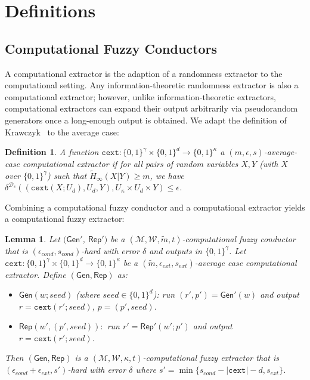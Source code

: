 \documentclass[11pt]{article}
\newcommand{\class}[1]{{\ensuremath{\mathsf{#1}}}}
\newcommand{\gen}{\ensuremath{\class{Gen}}\xspace}
\newcommand{\rep}{\ensuremath{\class{Rep}}\xspace}
\newcommand{\zo}{\ensuremath{\{0, 1\}}}
\newcommand{\cext}{\ensuremath{\mathtt{cext}}}
\newtheorem{lemma}[theorem]{Lemma}
\newtheorem{definition}[theorem]{Definition}
\begin{document}
\appendix

\section{Definitions}
\subsection{Computational Fuzzy Conductors}
\label{sec:further defs}
A computational extractor is the adaption of a randomness extractor to the computational setting.  Any information-theoretic randomness extractor is also a computational extractor; however, unlike information-theoretic extractors, computational extractors can expand their output arbitrarily via pseudorandom generators once a long-enough output is obtained. We adapt the definition of Krawczyk~\cite{krawczyk2010cryptographic} to the average case:
\begin{definition}
A function $\cext: \zo^\gamma \times \{0,1\}^d \rightarrow \{0,1\}^\kappa$ a \emph{$(m, \epsilon, s)$-average-case computational extractor} if for all pairs
of random variables $X, Y$ (with $X$ over $\zo^\gamma$) such that
$\tilde{H}_\infty(X|Y) \ge m$, we have $\delta^{\mathcal{D}_{s}}((\cext(X; U_d), U_d, Y), U_\kappa\times
U_d \times Y) \le \epsilon$.
\end{definition}

Combining a computational fuzzy conductor and a computational extractor yields a computational fuzzy extractor:

\begin{lemma}
\label{lem:cond and cext}
Let $(\gen'$, $\rep')$ be a $(\mathcal{M}, \mathcal{W}, \tilde{m}, t)$-computational fuzzy conductor that is $(\epsilon_{cond}, s_{cond})$-hard with error $\delta$ and outputs in $\zo^\gamma$.  Let $\cext:\zo^\gamma\times \zo^d\rightarrow \zo^\kappa$ be a $(\tilde{m}, \epsilon_{ext}, s_{ext})$-average case computational extractor.  Define $(\gen, \rep)$ as:
\begin{itemize}
\item $\gen(w; seed)$ (where $seed\in \zo^d$): run $(r', p')= \gen'(w)$ and output $r = \cext(r'; seed)$, $p = (p', seed)$.
\item $\rep(w', (p', seed)):$ run $r' = \rep'(w'; p')$ and output $r = \cext(r'; seed)$.
\end{itemize}
Then $(\gen, \rep)$ is a $(\mathcal{M}, \mathcal{W}, \kappa, t)$-computational fuzzy extractor that is $(\epsilon_{cond}+\epsilon_{ext}, s')$-hard with error $\delta$ where $s' = \min\{s_{cond} - |\cext| -d, s_{ext}\}$.
\end{lemma}
\end{document}
